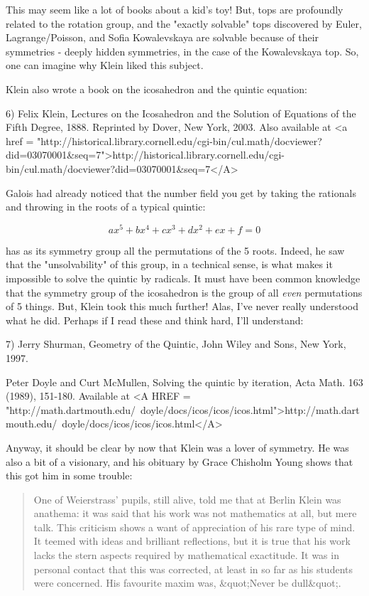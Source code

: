 This may seem like a lot of books about a kid's toy!  But, tops 
are profoundly related to the rotation group, and the "exactly 
solvable" tops discovered by Euler, Lagrange/Poisson, and 
Sofia Kowalevskaya are solvable because of their symmetries - 
deeply hidden symmetries, in the case of the Kowalevskaya top.  
So, one can imagine why Klein liked this subject.

Klein also wrote a book on the icosahedron and the quintic equation:

6) Felix Klein, Lectures on the Icosahedron and the Solution of Equations
of the Fifth Degree, 1888.  Reprinted by Dover, New York, 2003.
Also available at <a href = "http://historical.library.cornell.edu/cgi-bin/cul.math/docviewer?did=03070001&seq=7">http://historical.library.cornell.edu/cgi-bin/cul.math/docviewer?did=03070001&seq=7</A>

Galois had already noticed that the number field you get by taking the 
rationals and throwing in the roots of a typical quintic:

$$
ax^{5} + bx^{4} + cx^{3} + dx^{2} + ex + f = 0
$$
    
has as its symmetry group all the permutations of the 5 roots.  Indeed,
he saw that the "unsolvability" of this group, in a technical 
sense, is
what makes it impossible to solve the quintic by radicals.  It must have 
been common knowledge that the symmetry group of the icosahedron is the 
group of all \emph{even} permutations of 5 things.  But, Klein took this much
further!  Alas, I've never really understood what he did.  Perhaps if
I read these and think hard, I'll understand:

7) Jerry Shurman, Geometry of the Quintic, John Wiley and Sons, New York, 
1997.

Peter Doyle and Curt McMullen, Solving the quintic by iteration,
Acta Math. 163 (1989), 151-180.  Available at 
<A HREF = "http://math.dartmouth.edu/~doyle/docs/icos/icos/icos.html">http://math.dartmouth.edu/~doyle/docs/icos/icos/icos.html</A>

Anyway, it should be clear by now that Klein was a lover of symmetry.
He was also a bit of a visionary, and his obituary by Grace Chisholm 
Young shows that this got him in some trouble:

\begin{quote}
     One of Weierstrass' pupils, still alive, told me that at Berlin
     Klein was anathema: it was said that his work was not mathematics
     at all, but mere talk.  This criticism shows a want of appreciation
     of his rare type of mind.  It teemed with ideas and brilliant 
     reflections, but it is true that his work lacks the stern aspects 
     required by mathematical exactitude. It was in personal contact that 
     this was corrected, at least in so far as his students were concerned. 
     His favourite maxim was, &quot;Never be dull&quot;. 
\end{quote}
    

